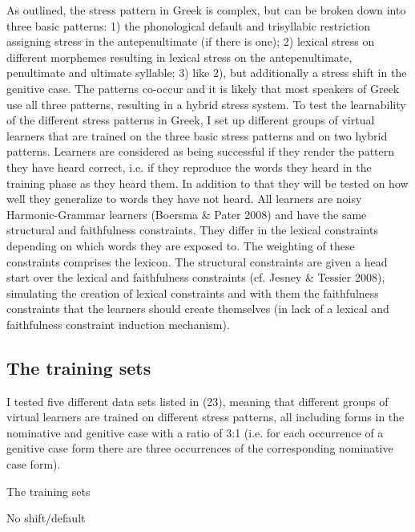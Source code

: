 \documentclass[a4paper]{article}
\begin{document}
As outlined, the stress pattern in Greek is complex, but can be broken down into three basic patterns: 1) the phonological default and trisyllabic restriction assigning stress in the antepenultimate (if there is one); 2) lexical stress on different morphemes resulting in lexical stress on the antepenultimate, penultimate and ultimate syllable; 3) like 2), but additionally a stress shift in the genitive case. The patterns co-occur and it is likely that most speakers of Greek use all three patterns, resulting in a hybrid stress system. To test the learnability of the different stress patterns in Greek, I set up different groups of virtual learners that are trained on the three basic stress patterns and on two hybrid patterns. Learners are considered as being successful if they render the pattern they have heard correct, i.e. if they reproduce the words they heard in the training phase as they heard them. In addition to that they will be tested on how well they generalize to words they have not heard. All learners are noisy Harmonic-Grammar learners (Boersma \& Pater 2008) and have the same structural and faithfulness constraints. They differ in the lexical constraints depending on which words they are exposed to. The weighting of these constraints comprises the lexicon. The structural constraints are given a head start over the lexical and faithfulness constraints (cf. Jesney \& Tessier 2008), simulating the creation of lexical constraints and with them the faithfulness constraints that the learners should create themselves (in lack of a lexical and faithfulness constraint induction mechanism).


\subsection{
The training sets}


I tested five different data sets listed in (23), meaning that different groups of virtual learners are trained on different stress patterns, all including forms in the nominative and genitive case with a ratio of 3:1 (i.e. for each occurrence of a genitive case form there are three occurrences of the corresponding nominative case form).

\ea The training sets

{
No shift/default}
\end{document}
